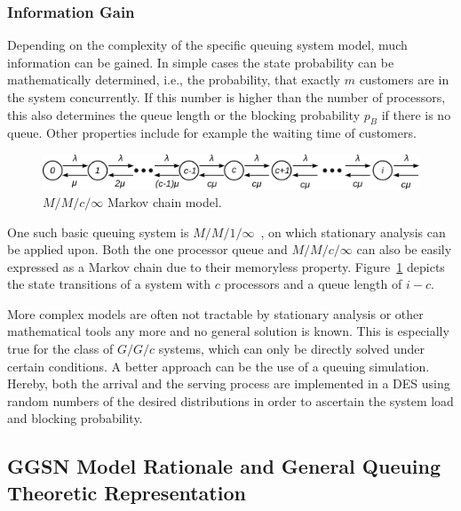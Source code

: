 \subsubsection{Information Gain}

Depending on the complexity of the specific queuing system model, much information can be gained. In simple cases the state probability can be mathematically determined, i.e., the probability, that exactly $m$ customers are in the system concurrently. If this number is higher than the number of processors, this also determines the queue length or the blocking probability $p_B$ if there is no queue. Other properties include for example the waiting time of customers.

\begin{figure}[htb]
	\centering
	\includegraphics[width=1.0\textwidth]{images/markovchain.pdf}
	\caption{$M/M/c/\infty$ Markov chain model.}
\label{c4:fig:markovchain}
\end{figure}


One such basic queuing system is $M/M/1/\infty$~\cite[pp.~94-99]{Kleinrock:1975:TVQ:1096491}, on which stationary analysis can be applied upon. Both the one processor queue and $M/M/c/\infty$ can also be easily expressed as a Markov chain due to their memoryless property. Figure~\ref{c4:fig:markovchain} depicts the state transitions of a system with $c$ processors and a queue length of $i-c$.

More complex models are often not tractable by stationary analysis or other mathematical tools any more and no general solution is known. This is especially true for the class of $G/G/c$ systems, which can only be directly solved under certain conditions. A better approach can be the use of a queuing simulation. Hereby, both the arrival and the serving process are implemented in a \gls{DES} using random numbers of the desired distributions in order to ascertain the system load and blocking probability.


\subsection{GGSN Model Rationale and General Queuing Theoretic Representation}

